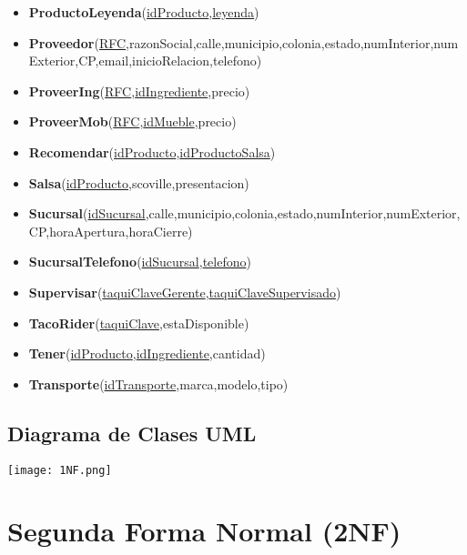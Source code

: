 \documentclass[11pt,letterpaper]{article}
\begin{document}
\begin{itemize}
\item \footnotesize{\textbf{ProductoLeyenda}(\underline{idProducto},\underline{leyenda})}
\item \scriptsize{\textbf{Proveedor}(\underline{RFC},razonSocial,calle,municipio,colonia,estado,numInterior,numExterior,CP,email,inicioRelacion,telefono)}
\item \footnotesize{\textbf{ProveerIng}(\underline{RFC},\underline{idIngrediente},precio)}
\item \footnotesize{\textbf{ProveerMob}(\underline{RFC},\underline{idMueble},precio)}
\item \footnotesize{\textbf{Recomendar}(\underline{idProducto},\underline{idProductoSalsa})}
\item \footnotesize{\textbf{Salsa}(\underline{idProducto},scoville,presentacion)}
\item {\footnotesize \textbf{Sucursal}(\underline{idSucursal},calle,municipio,colonia,estado,numInterior,numExterior,CP,horaApertura,horaCierre)}
\item \footnotesize{\textbf{SucursalTelefono}(\underline{idSucursal},\underline{telefono})}
\item \footnotesize{\textbf{Supervisar}(\underline{taquiClaveGerente},\underline{taquiClaveSupervisado})}
\item \footnotesize{\textbf{TacoRider}(\underline{taquiClave},estaDisponible)}
\item \footnotesize{\textbf{Tener}(\underline{idProducto},\underline{idIngrediente},cantidad)}
\item \footnotesize{\textbf{Transporte}(\underline{idTransporte},marca,modelo,tipo)}



\end{itemize}
\subsection{Diagrama de Clases UML}

\begin{landscape}
\begin{center}
\begin{minipage}{1\linewidth}
\texttt{[image: 1NF.png]}
\end{minipage}
\end{center}
\end{landscape}

\section{Segunda Forma Normal (2NF)}
\end{document}
